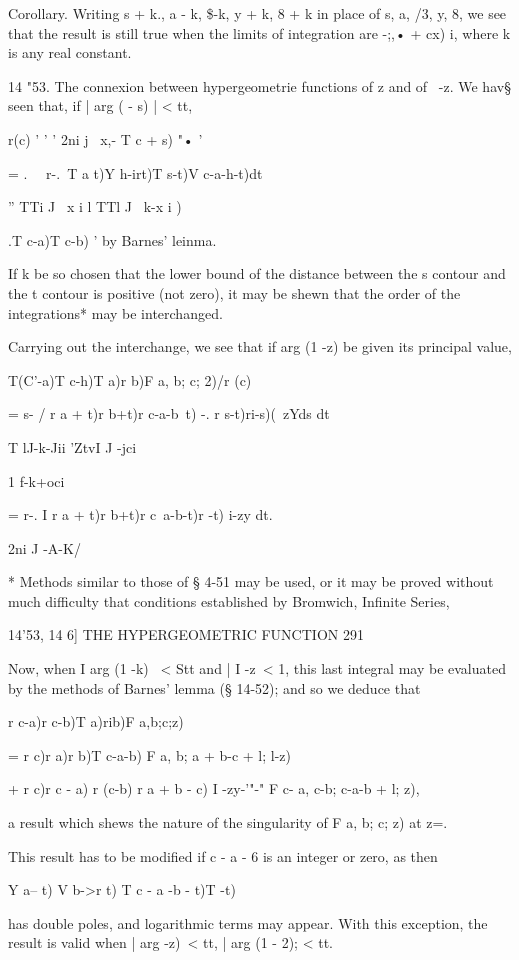 Corollary. Writing s + k., a - k, \$-k, y + k, 8 + k in place of s, a,
/3, y, 8, we see that the result is still true when the limits of
integration are -;,• + cx) i, where k is any real constant.

14 "53. The connexion between hypergeometrie functions of z and of \
-z. We hav§ seen that, if | arg ( - s) | < tt,

r(c) ' ' ' 2ni j \ x,- T c + s) "• '

= . \ \ r-.\ T a t)Y h-irt)T s-t)V c-a-h-t)dt\

'' TTi J \ x i l TTl J ~k-x i )

.T c-a)T c-b) ' by Barnes' leinma.

If k be so chosen that the lower bound of the distance between the s
contour and the t contour is positive (not zero), it may be shewn that
the order of the integrations* may be interchanged.

Carrying out the interchange, we see that if arg (1 -z) be given its
principal value,

T(C'-a)T c-h)T a)r b)F a, b; c; 2)/r (c)

= s- / r a + t)r b+t)r c-a-b~t) -. r s-t)ri-s)(~zYds dt

 T lJ-k-Jii 'ZtvI J -jci

1 f-k+oci

= r-. I r a + t)r b+t)r c~a-b-t)r -t) i-zy dt.

2ni J -A-K/

* Methods similar to those of § 4-51 may be used, or it may be proved
without much difficulty that conditions established by Bromwich,
Infinite Series, %

14'53, 14 6] THE HYPERGEOMETRIC FUNCTION 291

Now, when I arg (1 -k) \ < Stt and | I -z\ < 1, this last integral may
be evaluated by the methods of Barnes' lemma (§ 14-52); and so we
deduce that

r c-a)r c-b)T a)rib)F a,b;c;z)

= r c)r a)r b)T c-a-b) F a, b; a + b-c + l; l-z)

+ r c)r c - a) r (c-b) r a + b - c) I -zy-'"-" F c- a, c-b; c-a-b + l;
z),

a result which shews the nature of the singularity of F a, b; c; z)
at z=.

This result has to be modified if c - a - 6 is an integer or zero, as
then

Y a-- t) V b->r t) T c - a -b - t)T -t)

has double poles, and logarithmic terms may appear. With this
exception, the result is valid when | arg -z)\ < tt, | arg (1 - 2); <
tt.

